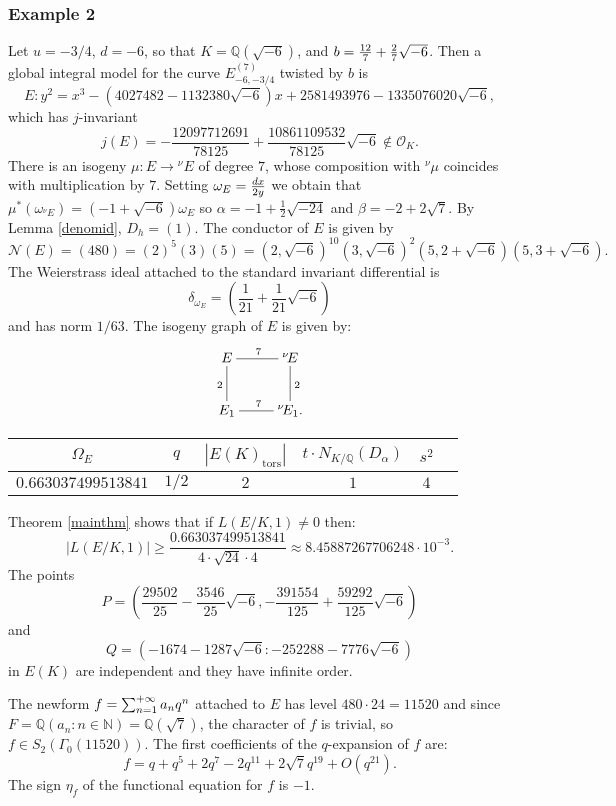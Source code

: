 \documentclass[11pt]{amsart}
\theoremstyle{definition}
\begin{document}
		\subsubsection*{Example 2}
		Let $u=-3/4$, $d=-6$, so that $K={\mathbb{Q}}(\sqrt{-6})$, and ${\displaystyle} b=\frac{12}{7}+\frac{2}{7}\sqrt{-6}$. Then a global integral model for the curve $E_{-6,-3/4}^{(7)}$ twisted by $b$ is
		$$E\colon y^2=x^3-(4027482-1132380\sqrt{-6})x +2581493976-1335076020\sqrt{-6},$$
		which has $j$-invariant
		$$j(E)=- \frac{12097712691}{78125}+\frac{10861109532}{78125}\sqrt{-6}\notin {\mathcal{O}}_K.$$
		There is an isogeny $\mu\colon E\to {{}^\nu\!} E$ of degree $7$, whose composition with ${{}^\nu\!}\mu$ coincides with multiplication by $7$. Setting ${\displaystyle} \omega_{E}=\frac{dx}{2y}$ we obtain that $\mu^*(\omega_{{{}^\nu\!} E})=(-1+\sqrt{-6})\omega_{E}$ so $\alpha=-1+\frac{1}{2}\sqrt{-24}$ and $\beta=-2+2\sqrt{7}$. By Lemma \ref{denomid}, $D_h=(1)$. The conductor of $E$ is given by
		$$\mathcal N(E)=(480)=(2)^5(3)(5)=(2, \sqrt{-6})^{10} (3, \sqrt{-6})^2 (5, 2+\sqrt{-6}) (5,3+ \sqrt{-6}).$$
		The Weierstrass ideal attached to the standard invariant differential is
		$$\delta_{\omega_E}=\left(\frac{1}{21}+\frac{1}{21}\sqrt{-6}\right)$$
		and has norm $1/63$.
		The isogeny graph of $E$ is given by:
		$$\begin{xymatrix}{
				   E\ar@{-}[r]^{7}\ar@{-}[d]_{2} & {{}^\nu\!} E \ar@{-}[d]^{2}\\
					E_1 \ar@{-}[r]^7 & {{}^\nu\!} E_1.
			  }\end{xymatrix}$$
			\begin{center}
				\begin{tabular}{| c | c | c | c | c | c |}
			    \hline
				$\Omega_E$ & $q$ & $|E(K)_{\text{tors}}|$ & $t\cdot N_{K/{\mathbb{Q}}}(D_{\alpha})$  & $s^2$ \\ \hline\hline
			    $0.663037499513841$ & $1/2$ & $2$ & $1$  & $4$\\ \hline
			  \end{tabular}
		\end{center}
		Theorem \ref{mainthm} shows that if $L(E/K,1)\neq 0$ then:
		$$|L(E/K,1)|\geq\frac{0.663037499513841}{4\cdot \sqrt{24}\cdot 4}\approx 8.45887267706248\cdot 10^{-3}.$$
		The points 
		$$P=\left(\frac{29502}{25}-\frac{3546}{25} \sqrt{-6} , -\frac{391554}{125}+\frac{59292}{125} \sqrt{-6} \right)$$
		and
		$$Q=\left(- 1674 -1287 \sqrt{-6} : - 252288-7776 \sqrt{-6} \right)$$
		in $E(K)$ are independent and they have infinite order.

		The newform ${\displaystyle} f=\sum_{n=1}^{+\infty}a_nq^n$ attached to $E$ has level $480\cdot 24=11520$ and since $F={\mathbb{Q}}(a_n\colon n\in {\mathbb{N}})={\mathbb{Q}}(\sqrt{7})$, the character of $f$ is trivial, so $f\in S_2(\Gamma_0(11520))$. The first coefficients of the $q$-expansion of $f$ are:
		$$f=q+q^5+2q^7-2q^{11}+2\sqrt{7}q^{19}+O(q^{21}).$$
		The sign $\eta_f$ of the functional equation for $f$ is $-1$.
\end{document}
